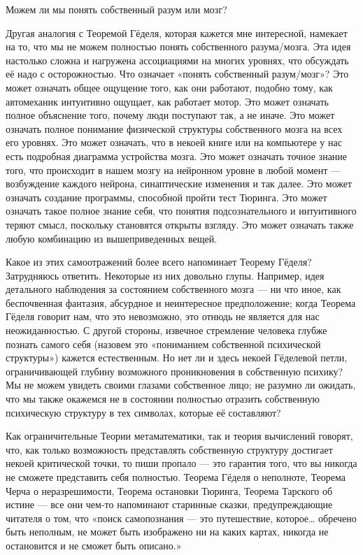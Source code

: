 \documentclass[../main.tex]{subfiles}
\begin{document}
Можем ли мы понять собственный разум или мозг?

Другая аналогия с Теоремой Гёделя, которая кажется мне интересной, намекает на то, что мы не можем полностью понять собственного разума/мозга. Эта идея настолько сложна и нагружена ассоциациями на многих уровнях, что обсуждать её надо с осторожностью. Что означает «понять собственный разум/мозг»? Это может означать общее ощущение того, как они работают, подобно тому, как автомеханик интуитивно ощущает, как работает мотор. Это может означать полное объяснение того, почему люди поступают так, а не иначе. Это может означать полное понимание физической структуры собственного мозга на всех его уровнях. Это может означать, что в некоей книге или на компьютере у нас есть подробная диаграмма устройства мозга. Это может означать точное знание того, что происходит в нашем мозгу на нейронном уровне в любой момент --- возбуждение каждого нейрона, синаптические изменения и так далее. Это может означать создание программы, способной пройти тест Тюринга. Это может означать такое полное знание себя, что понятия подсознательного и интуитивного теряют смысл, поскольку становятся открыты взгляду. Это может означать также любую комбинацию из вышеприведенных вещей.

Какое из этих самоотражений более всего напоминает Теорему Гёделя? Затрудняюсь ответить. Некоторые из них довольно глупы. Например, идея детального наблюдения за состоянием собственного мозга --- ни что иное, как беспочвенная фантазия, абсурдное и неинтересное предположение; когда Теорема Гёделя говорит нам, что это невозможно, это отнюдь не является для нас неожиданностью. С другой стороны, извечное стремление человека глубже познать самого себя (назовем это «пониманием собственной психической структуры») кажется естественным. Но нет ли и здесь некоей Гёделевой петли, ограничивающей глубину возможного проникновения в собственную психику? Мы не можем увидеть своими глазами собственное лицо; не разумно ли ожидать, что мы также окажемся не в состоянии полностью отразить собственную психическую структуру в тех символах, которые её составляют?

Как ограничительные Теории метаматематики, так и теория вычислений говорят, что, как только возможность представлять собственную структуру достигает некоей критической точки, то пиши пропало --- это гарантия того, что вы никогда не сможете представить себя полностью. Теорема Гёделя о неполноте, Теорема Черча о неразрешимости, Теорема остановки Тюринга, Теорема Тарского об истине --- все они чем-то напоминают старинные сказки, предупреждающие читателя о том, что «поиск самопознания --- это путешествие, которое\ldots{} обречено быть неполным, не может быть изображено ни на каких картах, никогда не остановится и не сможет быть описано.»
\end{document}
